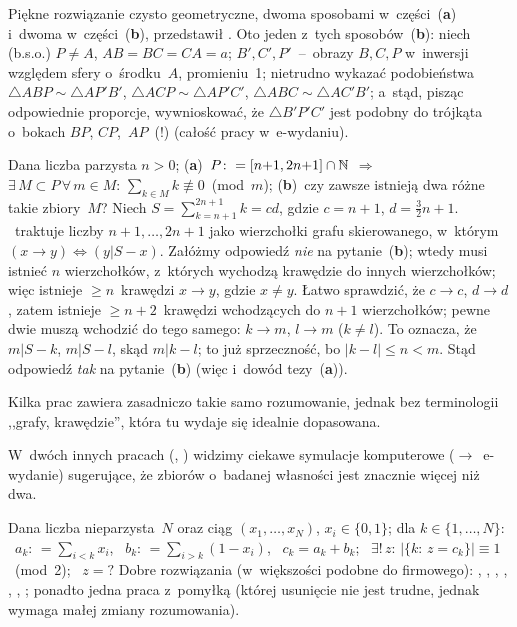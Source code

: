 {Piękne rozwiązanie czysto geometryczne, dwoma sposobami w~części~({\bf{a}}) i~dwoma w~części~({\bf{b}}), przedstawił \Ols. Oto jeden z~tych sposobów~({\bf{b}}): niech (b.s.o.)  ${P\ne{A}}$, ${AB=BC=CA=a}$; $B',C',P'$~--~obrazy $B,C,P$ w~inwersji względem sfery o~środku~$A$, promieniu~1; nietrudno wykazać podobieństwa
${\triangle{ABP}\sim\triangle{AP'B'}}$,
${\triangle{ACP}\sim\triangle{AP'C'}}$,
${\triangle{ABC}\sim\triangle{AC'B'}}$;
a~stąd, pisząc odpowiednie proporcje, wywnioskować, że $\triangle{B'P'C'}$ jest podobny do trójkąta o~bokach $BP$, $CP$,~$AP$~(!) (całość pracy w~e-wydaniu).


{Dana liczba parzysta ${n>0}$;
\hfil\break %
({\bf{a}})~${P\colon=[n{+}1,2n{+}1]\cap\mathbb N}$ $\Rightarrow$ ${\exists\,M\subset{P}\,\forall\,m\in{M}\colon\,\sum_{k\in{M}}k\not\equiv0}$~(mod~$m$);
({\bf{b}})~czy zawsze istnieją dwa różne takie zbiory~$M$?}
Niech ${S=\sum_{k=n+1}^{2n+1}k=cd}$, gdzie ${c=n+1}$, ${d=\frac32n+1}$. \Ols\ traktuje liczby $n{+}1,\ldots,2n{+}1$ jako wierzchołki grafu skierowanego, w~którym ${(x\to{y})\Leftrightarrow(y|S{-}x)}$.
Załóżmy odpowiedź {\it nie} na pytanie~({\bf{b}}); wtedy musi istnieć $n$ wierzchołków, z~których wychodzą krawędzie do innych wierzchołków; więc istnieje ${{}\ge{n}}$~krawędzi ${x\to{y}}$, gdzie ${x\ne{y}}$. Łatwo sprawdzić, że ${c\to{c}}$, ${d\to{d}}$, zatem istnieje ${{}\ge{n+2}}$~krawędzi wchodzących do ${n+1}$ wierzchołków; pewne dwie muszą wchodzić do tego samego: ${k\to{m}}$, ${l\to{m}}$ (${k\ne{l}}$). To oznacza, że ${m|S{-}k}$, ${m|S{-}l}$, skąd ${m|k{-}l}$; to już sprzeczność, bo ${|k-l|\le{n}<m}$. Stąd odpowiedź {\it tak} na pytanie~({\bf{b}}) (więc i~dowód tezy~({\bf{a}})).

Kilka prac zawiera zasadniczo takie samo rozumowanie, jednak bez terminologii ,,grafy, krawędzie'', która tu wydaje się idealnie dopasowana.

W~dwóch innych pracach (\kas, \kna) widzimy ciekawe symulacje komputerowe ($\to$~e-wydanie) sugerujące, że zbiorów o~badanej własności jest znacznie więcej niż dwa.


\vspace*{\parskip}
\begin{dwieszpalty}

{Dana liczba nieparzysta~$N$ oraz ciąg $(x_1,\ldots,x_N)$, ${x_i\in\{0,1\}}$; dla ${k\in\{1,\ldots,N\}}$: \
${a_k\colon\,=\sum_{i<k}x_i}$, \ ${b_k\colon\,=\sum_{i>k}(1{-}x_i)}$, \ ${c_k=a_k+b_k}$; \ ${\exists!\,z\colon\,|\{k\colon\,z=c_k\}|\equiv1}$~(mod~2); \ ${z=?}$}
Dobre rozwiązania (w~większości podobne do firmowego): \ada, \kuj, \ols, \war, \kas, \lab, \spy; ponadto jedna praca z~pomyłką (której usunięcie nie jest trudne, jednak wymaga małej zmiany rozumowania).



\end{dwieszpalty}}

